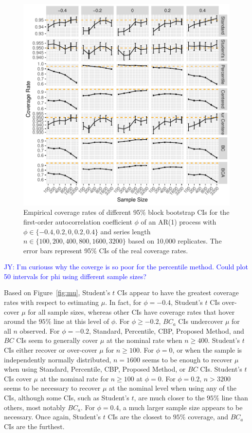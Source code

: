 \documentclass[12pt, letterpaper, titlepage]{article}
\newcommand{\jy}[1]{\textcolor{blue}{JY: #1}}
\begin{document}
\begin{figure}[tbp]
  \centering
  \includegraphics[width=\textwidth]{figures/plot_phi}
  \caption{Empirical coverage rates of different 95\% block bootstrap CIs for
    the first-order autocorrelation coefficient $\phi$ of an AR(1) process with
    $\phi \in \{-0.4, 0.2, 0, 0.2, 0.4\}$ and series length
    $n \in \{100, 200, 400, 800, 1600, 3200\}$ based on 10,000 replicates.
    The error bars represent 95\% CIs of the real coverage rates.}
  \label{fig:phi}
\end{figure}

\jy{I'm curiouss why the coverge is so poor for the percentile method. Could
  plot 50 intervals for phi using different sample sizes?}


Based on Figure~\ref{fig:mu}, 
Student's $t$ CIs appear to have the greatest coverage rates with respect 
to estimating $\mu$. In fact, for $\phi = -0.4$, Student's $t$ CIs over-cover $\mu$
for all sample sizes, whereas other CIs have coverage rates that
hover around the $95\%$ line at this level of $\phi$. For $\phi \geq -0.2$,
$BC_a$ CIs undercover $\mu$ for all $n$ observed. For $\phi = -0.2$, 
Standard, Percentile, CBP, Proposed Method, and $BC$ CIs seem to 
generally cover $\mu$ at the nominal 
rate when $n \geq 400$. Student's $t$ CIs either recover or over-cover $\mu$
for $n \geq 100$. For $\phi = 0$, or when the 
sample is independently normally distributed, $n = 1600$ seems to 
be enough to recover $\mu$ when using Standard, Percentile, CBP, Proposed Method, or $BC$ 
CIs. Student's $t$ CIs cover $\mu$ at the nominal rate for $n \geq 100$ at 
$\phi = 0$.
For $\phi = 0.2$, $n > 3200$ seems to be necessary to recover $\mu$
at the nominal level when using
any of the CIs, although some CIs, such as Student's $t$, are much closer to the
$95\%$ line than others, most notably $BC_a$.
For $\phi = 0.4$, a much larger sample size appears to be necessary. Once again,
Student's $t$ CIs are the closest to $95\%$ coverage, and $BC_a$ CIs are the furthest.
\end{document}

